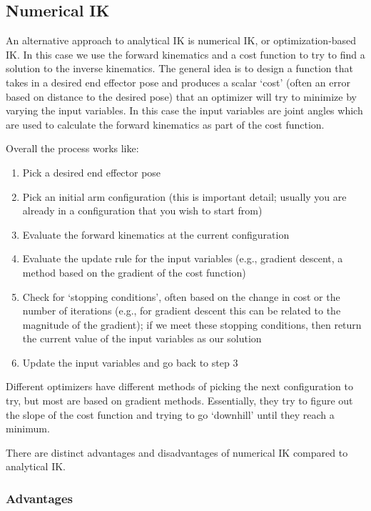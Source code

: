 \documentclass{16384_doc}
\begin{document}
\subsection{Numerical IK}

An alternative approach to analytical IK is numerical IK, or optimization-based
IK.  In this case we use the forward kinematics and a cost function to try to
find a solution to the inverse kinematics.  The general idea is to design a
function that takes in a desired end effector pose and produces a scalar `cost'
(often an error based on distance to the desired pose) that an optimizer will
try to minimize by varying the input variables. In this case the input variables
are joint angles which are used to calculate the forward kinematics as part of
the cost function.

Overall the process works like:
\begin{enumerate}
\item Pick a desired end effector pose
\item Pick an initial arm configuration (this is important detail; usually you
are already in a configuration that you wish to start from)
\item Evaluate the forward kinematics at the current configuration
\item Evaluate the update rule for the input variables (e.g., gradient descent,
a method based on the gradient of the cost function)
\item Check for `stopping conditions', often based on the change in cost or the
number of iterations (e.g., for gradient descent this can be related to the
magnitude of the gradient); if we meet these stopping conditions, then return
the current value of the input variables as our solution
\item Update the input variables and go back to step 3
\end{enumerate}

Different optimizers have different methods of picking the next configuration
to try, but most are based on gradient methods.  Essentially, they try to figure
out the slope of the cost function and trying to go ‘downhill’ until they reach a minimum.

There are distinct advantages and disadvantages of numerical IK compared to
analytical IK.

\subsubsection{Advantages}
\end{document}
